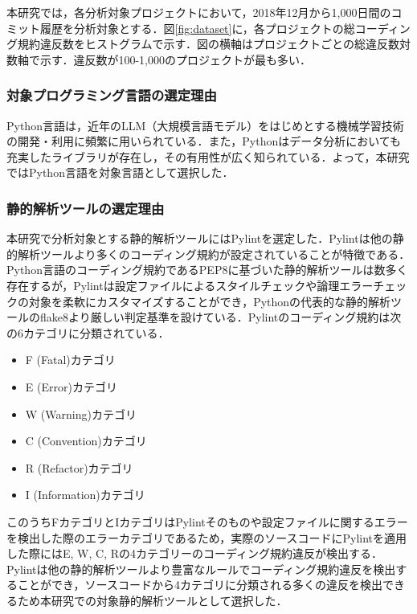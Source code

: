 \documentclass[submit,noauthor,dvipdfmx]{ipsj}
\begin{document}
本研究では，各分析対象プロジェクトにおいて，2018年12月から1,000日間のコミット履歴を分析対象とする．図\ref{fig:dataset}に，各プロジェクトの総コーディング規約違反数をヒストグラムで示す．図の横軸はプロジェクトごとの総違反数対数軸で示す．違反数が100-1,000のプロジェクトが最も多い．

\subsubsection{対象プログラミング言語の選定理由}

Python言語は，近年のLLM（大規模言語モデル）をはじめとする機械学習技術の開発・利用に頻繁に用いられている．また，Pythonはデータ分析においても充実したライブラリが存在し，その有用性が広く知られている．よって，本研究ではPython言語を対象言語として選択した．

\subsubsection{静的解析ツールの選定理由}

本研究で分析対象とする静的解析ツールにはPylintを選定した．Pylintは他の静的解析ツールより多くのコーディング規約が設定されていることが特徴である．Python言語のコーディング規約であるPEP8に基づいた静的解析ツールは数多く存在するが，Pylintは設定ファイルによるスタイルチェックや論理エラーチェックの対象を柔軟にカスタマイズすることができ，Pythonの代表的な静的解析ツールのflake8より厳しい判定基準を設けている．Pylintのコーディング規約は次の6カテゴリに分類されている．

\begin{itemize}
  \item F (Fatal)カテゴリ
  \item E (Error)カテゴリ
  \item W (Warning)カテゴリ
  \item C (Convention)カテゴリ
  \item R (Refactor)カテゴリ
  \item I (Information)カテゴリ
\end{itemize}

このうちFカテゴリとIカテゴリはPylintそのものや設定ファイルに関するエラーを検出した際のエラーカテゴリであるため，実際のソースコードにPylintを適用した際にはE, W, C, Rの4カテゴリーのコーディング規約違反が検出する．Pylintは他の静的解析ツールより豊富なルールでコーディング規約違反を検出することができ，ソースコードから4カテゴリに分類される多くの違反を検出できるため本研究での対象静的解析ツールとして選択した．
\end{document}
